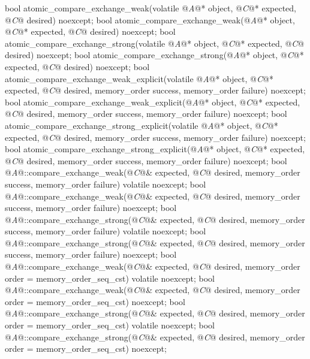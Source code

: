 \begin{itemdecl}
bool atomic_compare_exchange_weak(volatile @\textit{A}@* object, @\textit{C}@* expected, @\textit{C}@ desired) noexcept;
bool atomic_compare_exchange_weak(@\textit{A}@* object, @\textit{C}@* expected, @\textit{C}@ desired) noexcept;
bool atomic_compare_exchange_strong(volatile @\textit{A}@* object, @\textit{C}@* expected, @\textit{C}@ desired) noexcept;
bool atomic_compare_exchange_strong(@\textit{A}@* object, @\textit{C}@* expected, @\textit{C}@ desired) noexcept;
bool atomic_compare_exchange_weak_explicit(volatile @\textit{A}@* object, @\textit{C}@* expected, @\textit{C}@ desired,
    memory_order success, memory_order failure) noexcept;
bool atomic_compare_exchange_weak_explicit(@\textit{A}@* object, @\textit{C}@* expected, @\textit{C}@ desired,
    memory_order success, memory_order failure) noexcept;
bool atomic_compare_exchange_strong_explicit(volatile @\textit{A}@* object, @\textit{C}@* expected, @\textit{C}@ desired,
    memory_order success, memory_order failure) noexcept;
bool atomic_compare_exchange_strong_explicit(@\textit{A}@* object, @\textit{C}@* expected, @\textit{C}@ desired,
    memory_order success, memory_order failure) noexcept;
bool @\textit{A}@::compare_exchange_weak(@\textit{C}@& expected, @\textit{C}@ desired,
    memory_order success, memory_order failure) volatile noexcept;
bool @\textit{A}@::compare_exchange_weak(@\textit{C}@& expected, @\textit{C}@ desired,
    memory_order success, memory_order failure) noexcept;
bool @\textit{A}@::compare_exchange_strong(@\textit{C}@& expected, @\textit{C}@ desired,
    memory_order success, memory_order failure) volatile noexcept;
bool @\textit{A}@::compare_exchange_strong(@\textit{C}@& expected, @\textit{C}@ desired,
    memory_order success, memory_order failure) noexcept;
bool @\textit{A}@::compare_exchange_weak(@\textit{C}@& expected, @\textit{C}@ desired,
    memory_order order = memory_order_seq_cst) volatile noexcept;
bool @\textit{A}@::compare_exchange_weak(@\textit{C}@& expected, @\textit{C}@ desired,
    memory_order order = memory_order_seq_cst) noexcept;
bool @\textit{A}@::compare_exchange_strong(@\textit{C}@& expected, @\textit{C}@ desired,
    memory_order order = memory_order_seq_cst) volatile noexcept;
bool @\textit{A}@::compare_exchange_strong(@\textit{C}@& expected, @\textit{C}@ desired,
    memory_order order = memory_order_seq_cst) noexcept;
\end{itemdecl}

